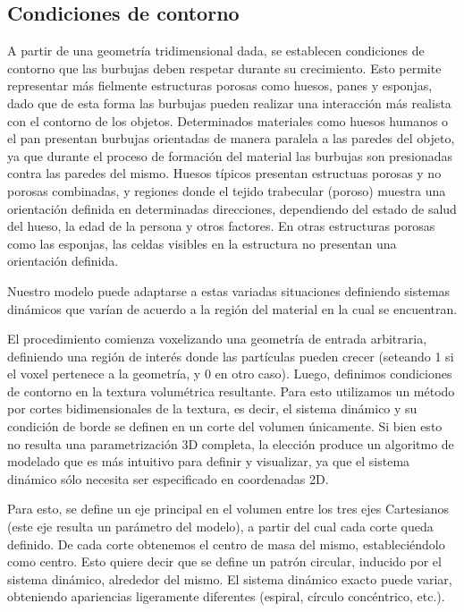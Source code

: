 \subsection{Condiciones de contorno}
A partir de una geometría tridimensional dada, se establecen condiciones de contorno que las burbujas deben respetar durante su crecimiento.
Esto permite representar más fielmente estructuras porosas como huesos, panes y esponjas, dado que de esta forma las burbujas pueden realizar una interacción más realista con el contorno de los objetos.
Determinados materiales como huesos humanos o el pan presentan burbujas orientadas de manera paralela a las paredes del objeto, ya que durante el proceso de formación del material las burbujas son presionadas contra las paredes del mismo.
Huesos típicos presentan estructuas porosas y no porosas combinadas, y regiones donde el tejido trabecular (poroso) muestra una orientación definida en determinadas direcciones, dependiendo del estado de salud del hueso, la edad de la persona y otros factores.
En otras estructuras porosas como las esponjas, las celdas visibles en la estructura no presentan una orientación definida.

Nuestro modelo puede adaptarse a estas variadas situaciones definiendo sistemas dinámicos que varían de acuerdo a la región del material en la cual se encuentran.

El procedimiento comienza voxelizando una geometría de entrada arbitraria, definiendo una región de interés donde las partículas pueden crecer (seteando 1 si el voxel pertenece a la geometría, y 0 en otro caso).
Luego, definimos condiciones de contorno en la textura volumétrica resultante.
Para esto utilizamos un método por cortes bidimensionales de la textura, es decir, el sistema dinámico y su condición de borde se definen en un corte del volumen únicamente.
Si bien esto no resulta una parametrización 3D completa, la elección produce un algoritmo de modelado que es más intuitivo para definir y visualizar, ya que el sistema dinámico sólo necesita ser especificado en coordenadas 2D.

Para esto, se define un eje principal en el volumen entre los tres ejes Cartesianos (este eje resulta un parámetro del modelo), a partir del cual cada corte queda definido.
De cada corte obtenemos el centro de masa del mismo, estableciéndolo como centro.
Esto quiere decir que se define un patrón circular, inducido por el sistema dinámico, alrededor del mismo.
El sistema dinámico exacto puede variar, obteniendo apariencias ligeramente diferentes (espiral, círculo concéntrico, etc.).

